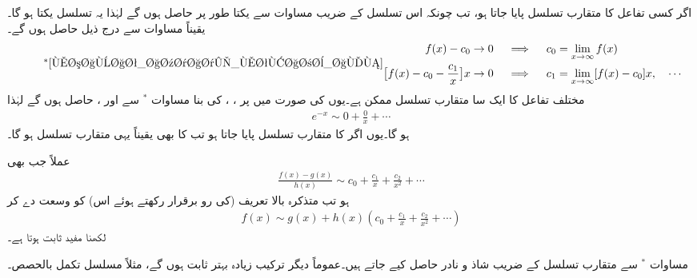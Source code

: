 اگر کسی تفاعل کا متقارب تسلسل پایا جاتا ہو، تب چونکہ اس تسلسل کے  ضریب   مساوات  سے یکتا طور پر حاصل ہوں گے لہٰذا  یہ تسلسل یکتا ہو گا۔یقیناً مساوات   سے درج ذیل حاصل ہوں گے۔
\begin{equation*}\tag*{${}^{\ast}$\ref{مساوات_اعدادی_متقارب_الف}}
\begin{aligned}
f(x)-c_0 &\to 0 \quad \implies \quad c_0=\lim_{x\to\infty} f(x)\\
\big[f(x)-c_0-\frac{c_1}{x}\big]x&\to 0\quad \implies \quad c_1=\lim_{x\to \infty} [f(x)-c_0]x, \quad \cdots
\end{aligned}
\end{equation*}
مختلف تفاعل کا ایک سا  متقارب تسلسل ممکن ہے۔یوں   کی صورت میں  پر ، ،   کی بنا  مساوات $^*$ سے  اور ،   حاصل ہوں گے لہٰذا
\begin{align*}
e^{-x} \sim 0+\frac{0}{x}+\cdots
\end{align*}
ہو گا۔یوں اگر  کا متقارب تسلسل پایا جاتا ہو تب  کا بھی یقیناً یہی متقارب تسلسل ہو گا۔

عملاً جب بھی
\begin{align*}
\frac{f(x)-g(x)}{h(x)}\sim  c_0+\frac{c_1}{x}+\frac{c_2}{x^2}+\cdots
\end{align*}
ہو تب متذکرہ بالا تعریف (کی رو برقرار رکھتے ہوئے اس) کو وسعت دے کر 
\begin{align*}
f(x)\sim g(x)+h(x)(c_0+\frac{c_1}{x}+\frac{c_2}{x^2}+\cdots)
\end{align*}
لکھنا مفید ثابت ہوتا ہے۔

مساوات $^*$ سے متقارب تسلسل کے  ضریب  شاذ و نادر حاصل کیے جاتے ہیں۔عموماً دیگر ترکیب زیادہ بہتر ثابت ہوں گے، مثلاً مسلسل تکمل بالحصص۔

